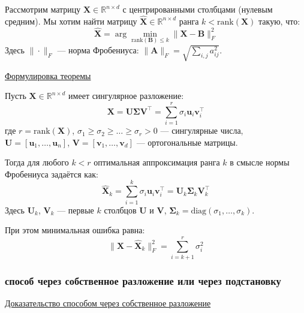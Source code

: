 Рассмотрим матрицу $\bm{X} \in \mathbb{R}^{n \times d}$ с центрированными столбцами (нулевым средним).
Мы хотим найти матрицу $\hat{\bm{X}} \in \mathbb{R}^{n \times d}$ ранга $k < \text{rank}(\bm{X})$ такую, что:
\[ \hat{\bm{X}} = \arg\min_{\text{rank}(\bm{B}) \leq k} \|\bm{X} - \bm{B}\|_F^2\]
Здесь $\|\cdot\|_F$ --- норма Фробениуса: $\|\bm{A}\|_F = \sqrt{\sum_{i,j} a_{ij}^2}$.

\underline{Формулировка теоремы}

\begin{theorem}
    Пусть $\bm{X} \in \mathbb{R}^{n \times d}$ имеет сингулярное разложение:
    \[ \bm{X} = \bm{U}\bm{\Sigma}\bm{V}^\top = \sum_{i=1}^{r} \sigma_i \bm{u}_i \bm{v}_i^\top \]
    где $r = \text{rank}(\bm{X})$, $\sigma_1 \geq \sigma_2 \geq \dots \geq \sigma_r > 0$ --- сингулярные числа,
    $\bm{U} = [\bm{u}_1, \dots, \bm{u}_n]$, $\bm{V} = [\bm{v}_1, \dots, \bm{v}_d]$ --- ортогональные матрицы.
    
    Тогда для любого $k < r$ оптимальная аппроксимация ранга $k$ в смысле нормы Фробениуса задаётся как:
    \[ \hat{\bm{X}}_k = \sum_{i=1}^{k} \sigma_i \bm{u}_i \bm{v}_i^\top = \bm{U}_k \bm{\Sigma}_k \bm{V}_k^\top \]
    Здесь $\bm{U}_k$, $\bm{V}_k$ --- первые $k$ столбцов $\bm{U}$ и $\bm{V}$, $\bm{\Sigma}_k = \text{diag}(\sigma_1, \dots, \sigma_k)$.
    
    При этом минимальная ошибка равна:
    \[ \|\bm{X} - \hat{\bm{X}}_k\|_F^2 = \sum_{i=k+1}^{r} \sigma_i^2 \]
\end{theorem}

\subsubsection{способ через собственное разложение или через подстановку}
\underline{Доказательство способом через собственное разложение}

